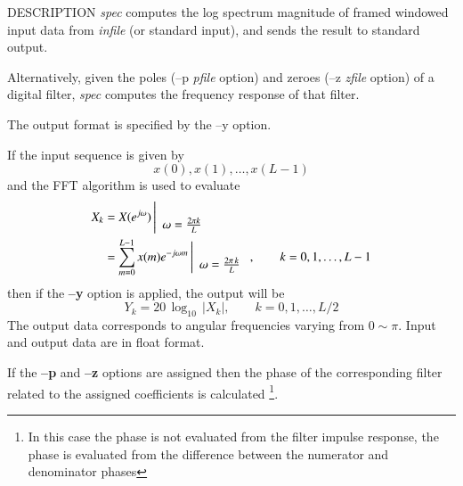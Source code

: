 \begin{synopsis}
 \item[spec]   [ --l $L$ ] [ --m $M$ ] [ --n $N$ ] [ --z {\em zfile} ]
               [ --p {\em pfile} ]
 \item[\ ~~~~] [ --e $e$ ] [ --E $E$ ] [ --o $O$ ] [ {\em infile} ]
\end{synopsis}

\begin{qsection}{DESCRIPTION}
{\em spec} computes the log spectrum magnitude of framed windowed input data 
from {\em infile} (or standard input), 
and sends the result to standard output.

Alternatively, given the poles (--p {\em pfile} option) 
and zeroes (--z {\em zfile} option) of a digital filter, 
{\em spec} computes the frequency response of that filter.

The output format is specified by the --y option.

If the input sequence is given by
\begin{displaymath}
  x(0), x(1), \dots, x(L-1)
\end{displaymath}
and the FFT algorithm is used to evaluate
\begin{align}
  X_k &= X(e^{j\omega}) \left|
	\begin{array}{c}
	\\
        \omega=\frac{2\pi k}{L}
	\end{array}
    \right. \notag \\
          &= \sum_{m=0}^{L-1}x(m)e^{-j\omega m} \left|
	\begin{array}{c}
	\\
        \omega=\frac{2\pi\, k}{L}
	\end{array}
    \right., \qquad k=0,1,\dots,L-1 \notag
\end{align}
then if the {\bf --y} option is applied, the output will be
\begin{displaymath}
  Y_k=20\,\log_{10}\,|X_k|,\qquad k=0,1,\dots,L/2
\end{displaymath}
The output data corresponds to angular frequencies varying from $0\sim \pi$.
Input and output data are in float format.
\par
If the {\bf --p} and {\bf --z} options are assigned
then the phase of the corresponding filter related to
the assigned coefficients is calculated
\footnote{
In this case the phase is not evaluated from the filter
impulse response, the phase is evaluated from
the difference between the numerator and denominator phases}.
\end{qsection}

